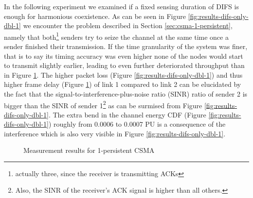 In the following experiment we examined if a fixed sensing duration of DIFS is enough for harmonious coexistence. As can be seen in Figure \ref{fig:results-difs-only-dbl-1} we encounter the problem described in Section \ref{sec:csma-1-persistent}, namely that both\footnote{actually three, since the receiver is transmitting ACKs} senders try to seize the channel at the same time once a sender finished their transmission. If the time granularity of the system was finer, that is to say its timing accuracy was even higher none of the nodes would start to transmit slightly earlier, leading to even further deteriorated throughput than in Figure \ref{fig:results-difs-only-dbl-2}. The higher packet loss (Figure \ref{fig:results-difs-only-dbl-1}) and thus higher frame delay (Figure \ref{fig:results-difs-only-dbl-2}) of link 1 compared to link 2  can be elucidated by the fact that the signal-to-interference-plus-noise ratio (SINR) ratio of sender 2 is bigger than the SINR of sender 1\footnote{Also, the SINR of the receiver's ACK signal is higher than all others.} as can be surmised from Figure \ref{fig:results-difs-only-dbl-1}. The extra bend in the channel energy CDF (Figure \ref{fig:results-difs-only-dbl-1}) roughly from 0.0006 to 0.0007 PU is a consequence of the interference which is also very visible in Figure \ref{fig:results-difs-only-dbl-1}.

\begin{figure}[tb]
	\label{fig:results-difs-only-dbl-2}
	\begin{center}
		\centerline{
		}	
	\end{center}
	\caption{Measurement results for 1-persistent CSMA}
\end{figure}

